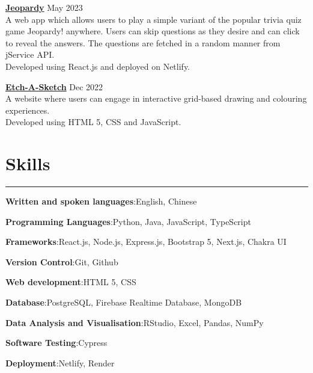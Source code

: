\documentclass[letterpaper,11pt]{article}
\begin{document}
    \vspace{0.5em}
    \textbf{\href {https://github.com/tjch-o/jeopardy}{Jeopardy}} \hfill May 2023
    \\
    A web app which allows users to play a simple variant of the popular trivia quiz game Jeopardy! 
    anywhere. Users can skip questions as they desire and can click to reveal the answers. The 
    questions are fetched in a random manner from jService API.
    \\
    Developed using React.js and deployed on Netlify.

    \vspace{0.5em}
    \textbf{\href {https://github.com/tjch-o/the-odin-project/tree/main/odin-etch-a-sketch}
    {Etch-A-Sketch}} \hfill Dec 2022
    \\
    A website where users can engage in interactive grid-based drawing and colouring experiences. 
    \\ 
    Developed using HTML 5, CSS and JavaScript.
     
    \section{Skills}
    \vspace{-0.5em}
    \hrule 
    \vspace{0.5em}
    \textbf{Written and spoken languages}:\space English, Chinese

    \vspace{0.5em}
    \textbf{Programming Languages}:\space Python, Java, JavaScript, TypeScript

    \vspace{0.5em}
    \textbf{Frameworks}:\space React.js, Node.js, Express.js, Bootstrap 5, Next.js, Chakra UI

    \vspace{0.5em}
    \textbf{Version Control}:\space Git, Github

    \vspace{0.5em}
    \textbf{Web development}:\space HTML 5, CSS

    \vspace{0.5em}
    \textbf{Database}:\space PostgreSQL, Firebase Realtime Database, MongoDB

    \vspace{0.5em}
    \textbf{Data Analysis and Visualisation}:\space RStudio, Excel, Pandas, NumPy 

    \vspace{0.5em}
    \textbf{Software Testing}:\space Cypress

    \vspace{0.5em}
    \textbf{Deployment}:\space Netlify, Render
\end{document}
